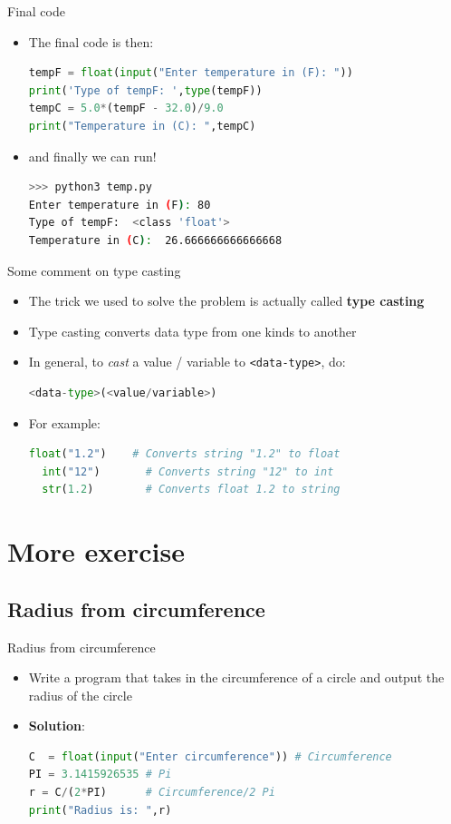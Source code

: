 \documentclass[10pt,xcolor={table,dvipsnames},t]{beamer}
\begin{document}
\begin{frame}[fragile]{Final code}
  \begin{itemize}
    \item The final code is then:
\begin{lstlisting}[language=python]
tempF = float(input("Enter temperature in (F): ")) 
print('Type of tempF: ',type(tempF))
tempC = 5.0*(tempF - 32.0)/9.0
print("Temperature in (C): ",tempC)
\end{lstlisting}
  \item and finally we can run!
\begin{lstlisting}[language=bash]
>>> python3 temp.py
Enter temperature in (F): 80
Type of tempF:  <class 'float'>
Temperature in (C):  26.666666666666668
\end{lstlisting}
  \end{itemize}
\end{frame}

\begin{frame}[fragile]{Some comment on type casting}
  \begin{itemize}
    \item The trick we used to solve the problem is actually called \textbf{type casting}
    \item Type casting converts data type from one kinds to another
    \item In general, to \textit{cast} a value / variable to \texttt{<data-type>}, do:
\begin{lstlisting}[language=python]
  <data-type>(<value/variable>)
\end{lstlisting}
    \item For example:
\begin{lstlisting}[language=python]
  float("1.2")    # Converts string "1.2" to float 
  int("12")       # Converts string "12" to int 
  str(1.2)        # Converts float 1.2 to string 
\end{lstlisting}
  \end{itemize}
\end{frame}

\section{More exercise}

\subsection{Radius from circumference}
\begin{frame}[fragile]{Radius from circumference}
  \begin{itemize}
    \item Write a program that takes in the circumference of a circle and output the radius of the circle
    \item \textbf{Solution}:
\begin{lstlisting}[language=python]
C  = float(input("Enter circumference")) # Circumference
PI = 3.1415926535 # Pi
r = C/(2*PI)      # Circumference/2 Pi
print("Radius is: ",r)
\end{lstlisting}
  \end{itemize}
\end{frame}
\end{document}
